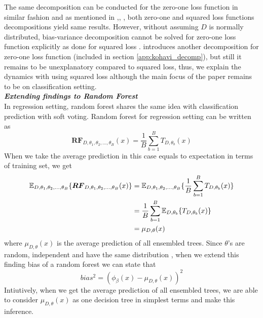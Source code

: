 The same decomposition can be conducted for the zero-one loss function in similar fashion and as mentioned in 
\cite{louppe2014understanding},\cite{domingos2000decomposition}, 
\cite{james2003variance}, \cite{friedman1997zeroLoss}
both zero-one and squared loss functions decompositions yield same results. 
However, without assuming $D$ is normally distributed, bias-variance decomposition 
cannot be solved for zero-one loss function explicitly as done for squared loss \cite{louppe2014understanding}. 
\cite{kohavi1996bias} introduces another decomposition for zero-one loss function (included in section \ref{app:kohavi_decomp}), 
but still it remains to be unexplanatory compared to squared loss, thus, 
we explain the dynamics with using squared loss although the main focus of the paper remains to be on classification setting.
\vspace{2mm}
\\
\textbf{\emph{Extending findings to Random Forest }}\\
In regression setting, random forest shares the same idea with classification prediction with soft voting. 
Random forest for regression setting can be written as
\begin{equation}
\boldsymbol{RF}_{D, \theta_{1},\theta_{2},..., \theta_{B}}(x) = \dfrac{1}{B}\sum_{b = 1}^{B}T_{D,\theta_{b}}(x)
\end{equation}
When we take the average prediction in this case equals to expectation in terms of training set, we get
\begin{align}\label{eq:mu}
\mathbb{E}_{D, \theta_{1}, \theta_{2},..., \theta_{B}}\{\boldsymbol{RF}_{D, \theta_{1},\theta_{2},..., \theta_{B}}(x) \} 
	& = \mathbb{E}_{D, \theta_{1}, \theta_{2},..., \theta_{B}}\{\dfrac{1}{B}\sum_{b = 1}^{B}T_{D,\theta_{b}}(x)\} \notag \\
	& = \dfrac{1}{B}\sum_{b=1}^{B}\mathbb{E}_{D,\theta_{b}}\{T_{D, \theta_{b}}(x)\}\notag \\
	& = \mu_{D,\theta}(x)
\end{align}
where $\mu_{D,\theta}(x)$ is the average prediction of all ensembled trees. Since $\theta$'s are random, 
independent and have the same distribution \cite{louppe2014understanding}, when we extend this finding bias of a random forest 
we can state that 
\begin{equation}\label{eq:random_forest_bias}
bias^2 = (\phi_{\beta}(x) - \mu_{D,\theta}(x))^2
\end{equation}
Intiutively, when we get the average prediction of all ensembled trees, 
we are able to consider $\mu_{D,\theta}(x)$ as one decision tree in simplest terms and make this inference.
